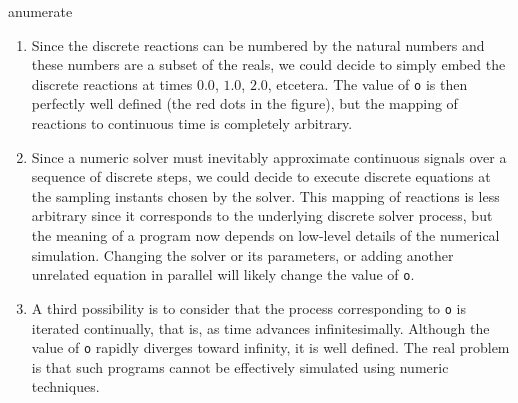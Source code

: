\documentclass[11pt,titlepage,twoside]{report}
\makeatletter
\newcommand{\zls}[1]{{\@span{class="zelusinline"}#1}}
\newcommand{\zls}[1]{\texttt{#1}}
\renewcommand{\zls}[1]{\texttt{#1}}
\newenvironment{anumerate}
  {\begin{divstyle}{anumerate}\begin{enumerate}}
  {\end{enumerate}\end{divstyle}}
\newenvironment{anumerate}
  {\begin{enumerate}[label=(\emph{\alph*})]}
  {\end{enumerate}}
\makeatother
\begin{document}
\begin{anumerate}
\item
Since the discrete reactions can be numbered by the natural numbers and 
these numbers are a subset of the reals, we could decide to simply embed the 
discrete reactions at times $0.0$, $1.0$, $2.0$, etcetera.
The value of \zls{o} is then perfectly well defined (the red dots in the 
figure), but the mapping of reactions to continuous time is completely 
arbitrary.

\item
Since a numeric solver must inevitably approximate continuous signals over a 
sequence of discrete steps, we could decide to execute discrete equations at 
the sampling instants chosen by the solver.
This mapping of reactions is less arbitrary since it corresponds to the 
underlying discrete solver process, but the meaning of a program now depends 
on low-level details of the numerical simulation.
Changing the solver or its parameters, or adding another unrelated equation 
in parallel will likely change the value of \zls{o}.

\item
A third possibility is to consider that the process corresponding to \zls{o} 
is iterated continually, that is, as time advances infinitesimally.
Although the value of \zls{o} rapidly diverges toward infinity, it is well 
defined.
The real problem is that such programs cannot be effectively simulated using 
numeric techniques.
\end{anumerate}
\end{document}
